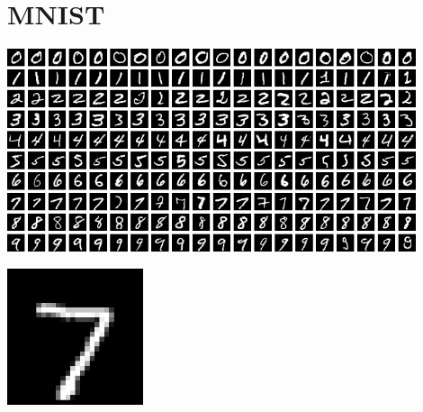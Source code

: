 \documentclass[12pt]{article}
\newcommand{\SectionTitle}[1]{\section*{\centering #1}\bigskip}
\begin{document}
\SectionTitle{MNIST}

\begin{center}
\includegraphics[width=12cm]{mnist.png}
\end{center}

\bigskip

\begin{center}
\includegraphics[width=4cm]{digit.png}
\end{center}

\bigskip
\end{document}

